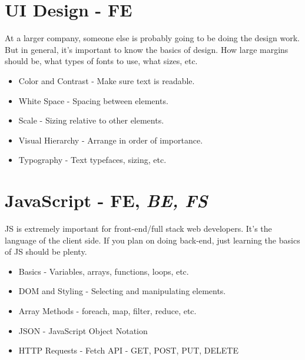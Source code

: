\section{UI Design - FE}

At a larger company, someone else is probably going to be doing the design work. But in general, it's important to know the basics of design. How large margins should be, what types of fonts to use, what sizes, etc.
\begin{itemize}
    \item Color and Contrast - Make sure text is readable.
    \item White Space - Spacing between elements.
    \item Scale - Sizing relative to other elements.
    \item Visual Hierarchy - Arrange in order of importance.
    \item Typography - Text typefaces, sizing, etc.
\end{itemize}

\section{JavaScript - FE, \emph{BE, FS}}
JS is extremely important for front-end/full stack web developers. It's the language of the client side. If you plan on doing back-end, just learning the basics of JS should be plenty. 

\begin{itemize}
    \item Basics - Variables, arrays, functions, loops, etc.
    \item DOM and Styling - Selecting and manipulating elements.
    \item Array Methods - foreach, map, filter, reduce, etc.
    \item JSON - JavaScript Object Notation
    \item HTTP Requests - Fetch API - GET, POST, PUT, DELETE
\end{itemize}
